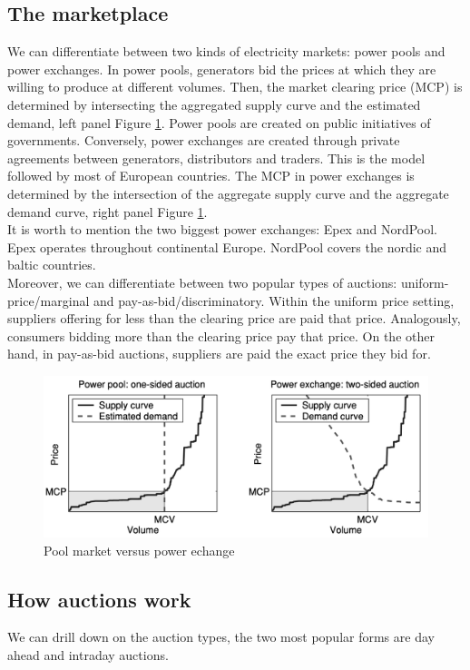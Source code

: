 \subsection{The marketplace}
We can differentiate between two kinds of electricity markets: power pools and power exchanges. In power pools, generators bid the prices at which they are willing to produce at different volumes. Then, the market clearing price (MCP) is determined by intersecting the aggregated supply curve and the estimated demand, left panel Figure \ref{fig:pool_vs_echange}. Power pools are created on public initiatives of governments. Conversely, power exchanges are created through private agreements between generators, distributors and traders. This is the model followed by most of European countries.
The MCP in power exchanges is determined by the intersection of the aggregate supply curve and the aggregate demand curve, right panel Figure \ref{fig:pool_vs_echange}.
\\
It is worth to mention the two biggest power exchanges: Epex and NordPool. Epex operates throughout continental Europe. NordPool covers the nordic and baltic countries.
\\
Moreover, we can differentiate between two popular types of auctions: uniform-price/marginal and pay-as-bid/discriminatory. Within the uniform price setting, suppliers offering for less than the clearing price are paid that price. Analogously, consumers bidding more than the clearing price pay that price. On the other hand, in pay-as-bid auctions, suppliers are paid the exact price they bid for.


\begin{figure}[!h]
    \includegraphics[width=\textwidth]{images/pool_vs_echange.png}
    \caption{Pool market versus power echange \cite{weron2006modeling}}
    \label{fig:pool_vs_echange}
\end{figure}

\subsection{How auctions work}
We can drill down on the auction types, the two most popular forms are day ahead and intraday auctions.

